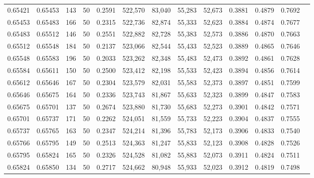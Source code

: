 \begin{tabular}{rrrrrrrrrrrrr}
0.65421 & 0.65453 &   143 &  50 &                                     0.2591 & 522,570 &  83,040 &  55,283 &  52,673 & 0.3881 & 0.4879 & 0.7692 \\
0.65453 & 0.65483 &   166 &  50 &                                     0.2315 & 522,736 &  82,874 &  55,333 &  52,623 & 0.3884 & 0.4874 & 0.7677 \\
0.65483 & 0.65512 &   146 &  50 &                                     0.2551 & 522,882 &  82,728 &  55,383 &  52,573 & 0.3886 & 0.4870 & 0.7663 \\
0.65512 & 0.65548 &   184 &  50 &                                     0.2137 & 523,066 &  82,544 &  55,433 &  52,523 & 0.3889 & 0.4865 & 0.7646 \\
0.65548 & 0.65583 &   196 &  50 &                                     0.2033 & 523,262 &  82,348 &  55,483 &  52,473 & 0.3892 & 0.4861 & 0.7628 \\
0.65584 & 0.65611 &   150 &  50 &                                     0.2500 & 523,412 &  82,198 &  55,533 &  52,423 & 0.3894 & 0.4856 & 0.7614 \\
0.65612 & 0.65646 &   167 &  50 &                                     0.2304 & 523,579 &  82,031 &  55,583 &  52,373 & 0.3897 & 0.4851 & 0.7599 \\
0.65646 & 0.65675 &   164 &  50 &                                     0.2336 & 523,743 &  81,867 &  55,633 &  52,323 & 0.3899 & 0.4847 & 0.7583 \\
0.65675 & 0.65701 &   137 &  50 &                                     0.2674 & 523,880 &  81,730 &  55,683 &  52,273 & 0.3901 & 0.4842 & 0.7571 \\
0.65701 & 0.65737 &   171 &  50 &                                     0.2262 & 524,051 &  81,559 &  55,733 &  52,223 & 0.3904 & 0.4837 & 0.7555 \\
0.65737 & 0.65765 &   163 &  50 &                                     0.2347 & 524,214 &  81,396 &  55,783 &  52,173 & 0.3906 & 0.4833 & 0.7540 \\
0.65766 & 0.65795 &   149 &  50 &                                     0.2513 & 524,363 &  81,247 &  55,833 &  52,123 & 0.3908 & 0.4828 & 0.7526 \\
0.65795 & 0.65824 &   165 &  50 &                                     0.2326 & 524,528 &  81,082 &  55,883 &  52,073 & 0.3911 & 0.4824 & 0.7511 \\
0.65824 & 0.65850 &   134 &  50 &                                     0.2717 & 524,662 &  80,948 &  55,933 &  52,023 & 0.3912 & 0.4819 & 0.7498 \\

\end{tabular}
